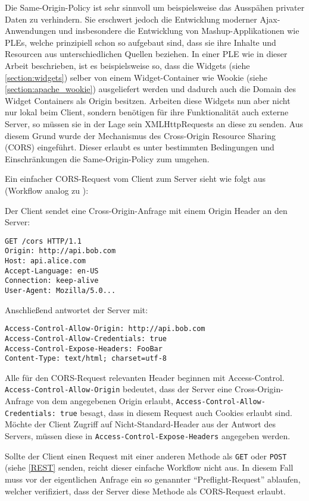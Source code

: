 Die Same-Origin-Policy ist sehr sinnvoll um beispielsweise das Ausspähen privater Daten zu verhindern. Sie erschwert jedoch die Entwicklung moderner Ajax-Anwendungen und insbesondere die Entwicklung von Mashup-Applikationen wie PLEs, welche prinzipiell schon so aufgebaut sind, dass sie ihre Inhalte und Resourcen aus unterschiedlichen Quellen beziehen. In einer PLE wie in dieser Arbeit beschrieben, ist es beispielsweise so, dass die Widgets (siehe \ref{section:widgets}) selber von einem Widget-Container wie Wookie (siehe \ref{section:apache_wookie}) ausgeliefert werden und dadurch auch die Domain des Widget Containers als Origin besitzen. Arbeiten diese Widgets nun aber nicht nur lokal beim Client, sondern benötigen für ihre Funktionalität auch externe Server, so müssen sie in der Lage sein XMLHttpRequests an diese zu senden. Aus diesem Grund wurde der Mechanismus des Cross-Origin Resource Sharing (CORS)\cite{cors_w3c} eingeführt. Dieser erlaubt es unter bestimmten Bedingungen und Einschränkungen die Same-Origin-Policy zum umgehen.

Ein einfacher CORS-Request vom Client zum Server sieht wie folgt aus (Workflow analog zu \cite{cors_html5rocks}):

Der Client sendet eine Cross-Origin-Anfrage mit einem Origin Header an den Server:
\begin{lstlisting}
GET /cors HTTP/1.1
Origin: http://api.bob.com
Host: api.alice.com
Accept-Language: en-US
Connection: keep-alive
User-Agent: Mozilla/5.0...
\end{lstlisting}
 
Anschließend antwortet der Server mit:
\begin{lstlisting}
Access-Control-Allow-Origin: http://api.bob.com
Access-Control-Allow-Credentials: true
Access-Control-Expose-Headers: FooBar
Content-Type: text/html; charset=utf-8
\end{lstlisting}
Alle für den CORS-Request relevanten Header beginnen mit Access-Control. \texttt{Access-Control-Allow-Origin} bedeutet, dass der Server eine Cross-Origin-Anfrage von dem angegebenen Origin erlaubt, \texttt{Access-Control-Allow-Credentials: true} besagt, dass in diesem Request auch Cookies erlaubt sind. Möchte der Client Zugriff auf Nicht-Standard-Header aus der Antwort des Servers, müssen diese in \texttt{Access-Control-Expose-Headers} angegeben werden.

Sollte der Client einen Request mit einer anderen Methode als \texttt{GET} oder \texttt{POST} (siehe \ref{REST} senden, reicht dieser einfache Workflow nicht aus. In diesem Fall muss vor der eigentlichen Anfrage ein so genannter "`Preflight-Request"' ablaufen, welcher verifiziert, dass der Server diese Methode als CORS-Request erlaubt.

